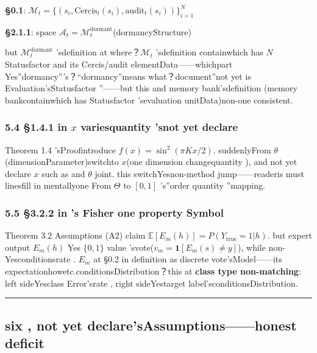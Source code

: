 \documentclass[
  12pt,
]{article}
\begin{document}
\textbf{§0.1}: \(\mathcal{M}_t = \{(s_i, \text{Cercis}_t(s_i), \text{audit}_t(s_i))\}_{i=1}^{N}\)

\textbf{§2.1.1}: space 
\(\mathcal{A}_t = \mathcal{M}_t^{\text{dormant}}\)(dormancyStructure)

but  \(\mathcal{M}_t^{\text{dormant}}\) 'sdefinition at where？\(\mathcal{M}_t\)
'sdefinition containwhich has  \(N\) Statusfactor and its  Cercis/audit
elementData------whichpart Yes''dormancy'''s？``dormancy''means what？document''not yet is Evaluation'sStatusfactor ''------but this and memory bank'sdefinition (memory bankcontainwhich has Statusfactor 'sevaluation unitData)non-one consistent. 

\subsubsection{\texorpdfstring{5.4 §1.4.1 in  \(x\)
variesquantity 'snot yet declare}{5.4 §1.4.1 in  x quantity 'snot yet declare}}\label{ux4e2d-x-ux53d8ux91cfux7684ux672aux58f0ux660e}

Theorem 1.4 'sProofintroduce  \(f(x) = \sin^2(\pi K x / 2)\). suddenlyFrom
\(\theta\)(dimensionParameter)switchto  \(x\)(one dimension changequantity ), and not yet declare \(x\) such as and 
\(\theta\) joint. this switchYesnon-method jump------readeris must linesfill in mentallyone From
\(\Theta\) to  \([0,1]\) 's''order quantity ''mapping. 

\subsubsection{5.5 §3.2.2 in 's Fisher
one property Symbol}\label{ux4e2dux7684-fisher-ux4e00ux81f4ux6027ux7b26ux53f7}

Theorem 3.2 Assumptions (A2) claim
\(\mathbb{E}[E_m(h)] = P(Y_{\text{true}} = 1 | h)\). but expert output
\(E_m(h)\) Yes \(\{0,1\}\)
value 'svote(\(v_m = \mathbf{1}[E_m(s) \neq y]\)), while non-Yesconditionsrate . \(E_m\)
at  §0.2
in definition as discrete vote'sModel------its expectationhowetc.conditionsDistribution？this at \textbf{class type non-matching}: left sideYesclass Error'srate , right sideYestarget label'sconditionsDistribution. 

\begin{center}\rule{0.5\linewidth}{0.5pt}\end{center}

\subsection{six , not yet declare'sAssumptions------honest deficit}\label{ux516dux672aux58f0ux660eux7684ux5047ux8bbeux8bdaux5b9eux5ea6ux8d64ux5b57}
\end{document}
